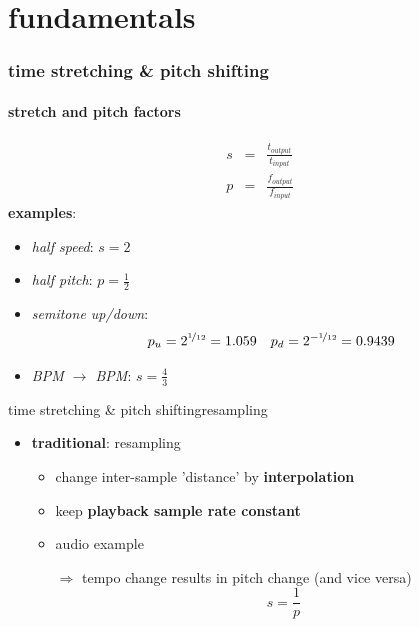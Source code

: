 \section[basics]{fundamentals}
\begin{frame}\frametitle{time stretching \& pitch shifting}\framesubtitle{stretch and pitch factors}
	\begin{eqnarray*}
		s	&=& \frac{t_{output}}{t_{input}}\\
		p	&=& \frac{f_{output}}{f_{input}}
	\end{eqnarray*}
	\pause
	\textbf{examples}:
	\begin{itemize}
		\item	\textit{half speed}: 
			\pause
			$s = 2$
		\pause
		\item	\textit{half pitch}: 
			\pause
			$p = \frac{1}{2}$
		\pause
		\item	\textit{semitone up/down}: 
			\pause
			\begin{equation}
				p_u = 2^{\nicefrac{1}{12}} = 1.059\quad p_d = 2^{-\nicefrac{1}{12}} = 0.9439\nonumber
			\end{equation}
		\pause
		\item	\textit{\unit[100]{BPM} $\rightarrow$ \unit[75]{BPM}}: 
			\pause
			$s = \frac{4}{3}$
	\end{itemize}
\end{frame}
    \begin{frame}{time stretching \& pitch shifting}{resampling}
        \begin{itemize}
            \item   \textbf{traditional}: resampling
                \begin{itemize}
                    \item   change inter-sample 'distance' by \textbf{interpolation}
                    \item   keep \textbf{playback sample rate constant}
                    \pause
                    \bigskip
                    \item   audio example
                    \pause
                    \bigskip 
                    \item[$\Rightarrow$] tempo change results in pitch change (and vice versa)
                    \begin{equation*}
                        s = \frac{1}{p}
                    \end{equation*}
                \end{itemize}
        \end{itemize}
    \end{frame}
 
